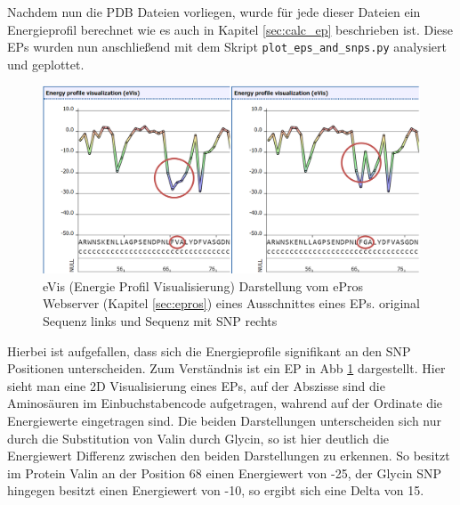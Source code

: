 Nachdem nun die \ac{PDB} Dateien vorliegen, wurde für jede dieser Dateien ein Energieprofil berechnet wie es auch in Kapitel \ref{sec:calc_ep} beschrieben ist. Diese \ac{EPs} wurden nun anschließend mit dem Skript \texttt{plot\_eps\_and\_snps.py} analysiert und geplottet. 
%
\begin{figure}
    \centering
    \includegraphics[width=.99\textwidth]{images/ep_vs_snp.png}
    \caption{eVis (Energie Profil Visualisierung) Darstellung vom ePros Webserver (Kapitel \ref{sec:epros}) eines Ausschnittes eines \ac{EP}s. original Sequenz links und Sequenz mit \ac{SNP} rechts}
    \label{fig:ep_vs_snp}
\end{figure}

Hierbei ist aufgefallen, dass sich die Energieprofile signifikant an den \ac{SNP} Positionen unterscheiden. Zum Verständnis ist ein \ac{EP} in \ac{Abb} \ref{fig:ep_vs_snp} dargestellt. Hier sieht man eine 2D Visualisierung eines \ac{EP}s, auf der Abszisse sind die Aminosäuren im Einbuchstabencode aufgetragen, wahrend auf der Ordinate die Energiewerte eingetragen sind. Die beiden Darstellungen unterscheiden sich nur durch die Substitution von Valin durch Glycin, so ist hier deutlich die Energiewert Differenz zwischen den beiden Darstellungen zu erkennen. So besitzt im Protein Valin an der Position 68 einen Energiewert von -25, der Glycin \ac{SNP} hingegen besitzt einen Energiewert von -10, so ergibt sich eine Delta von 15.

